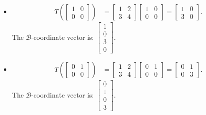 \documentclass[10pt]{article}
\begin{document}
\begin{itemize}
    \item
    \begin{align*}
        T\left(\begin{bmatrix} 1 & 0 \\ 0 & 0 \end{bmatrix}\right)
        &= 
        \begin{bmatrix} 1 & 2 \\ 3 & 4 \end{bmatrix}
        \begin{bmatrix} 1 & 0 \\ 0 & 0 \end{bmatrix}
        = \begin{bmatrix} 1 & 0 \\ 3 & 0 \end{bmatrix}.
    \end{align*}
    \noindent The $\mathcal{B}$-coordinate vector is: $\begin{bmatrix} 1 \\ 0 \\ 3 \\ 0 \end{bmatrix}$.
    
    \item
    \begin{align*}
        T\left(\begin{bmatrix} 0 & 1 \\ 0 & 0 \end{bmatrix}\right)
        &= 
        \begin{bmatrix} 1 & 2 \\ 3 & 4 \end{bmatrix}
        \begin{bmatrix} 0 & 1 \\ 0 & 0 \end{bmatrix}
        = \begin{bmatrix} 0 & 1 \\ 0 & 3 \end{bmatrix}.
    \end{align*}
    \noindent The $\mathcal{B}$-coordinate vector is: $\begin{bmatrix} 0 \\ 1 \\ 0 \\ 3 \end{bmatrix}$.
    

\end{itemize}
\end{document}
